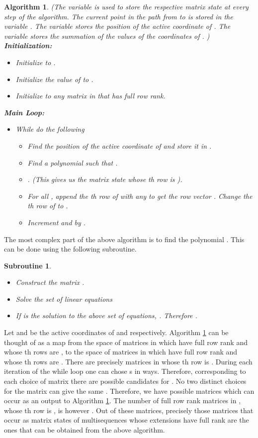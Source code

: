 \documentclass[letterpaper, 12 pt]{article}  \usepackage{amssymb}
\newtheorem{algorithm}[theorem]{Algorithm}
\newtheorem{subroutine}[theorem]{Subroutine}
\begin{document}
\begin{algorithm}
\label{algo}
(The variable  is used to store the respective matrix state at every step of
the algorithm. The current point in the path from  to  is stored in
the variable . The variable  stores the position of
the active coordinate of . The variable  stores the summation of the
values of the coordinates of . ) \\
{\bf Initialization:}
\begin{itemize}
 \item Initialize  to .  
 \item Initialize the value of  to .
 \item Initialize  to any matrix in  that has full
row rank.  
\end{itemize}
{\bf Main Loop:}
 \begin{itemize}
    \item While  do the following
    \begin{itemize}
    \item Find the position of the active coordinate of  and store it
in . 
    \item Find a polynomial  such
that .
                       \item . (This gives us the matrix
state whose th row is ).
                       \item  For all , append the th row of 
with any   to get the row vector . Change the th
row of  to .
                       \item Increment  and  by . 
       \end{itemize}
   \end{itemize}
\end{algorithm}
The most complex part of the above algorithm is to find the polynomial .
This can be done using the following subroutine.
\begin{subroutine}
\begin{itemize}
 \item Construct the matrix .
 \item Solve the set of linear equations 

 \item If  is the solution to the above set of
equations, . Therefore .
\end{itemize}
\end{subroutine}

Let  and  be the active coordinates of 
and  respectively. Algorithm \ref{algo} can be thought of as a map from the space of
matrices in  which have full row rank and whose
th rows are , to the space of matrices in  which have full row rank and whose th rows are .  There are precisely 
matrices in  whose th row
is . During each iteration of the while loop one can chose s 
in  ways. Therefore, corresponding to each choice of matrix  there are 
possible candidates for . No two distinct choices for the matrix  can give the
same . Therefore, we have  possible matrices which
can occur as an output to Algorithm \ref{algo}. The
number of full row rank matrices in , whose th row is
, is however .
Out of these matrices, precisely those matrices that occur as matrix
states of multisequences whose extensions have full rank are the ones that can be obtained from the above algorithm.
\end{document}
